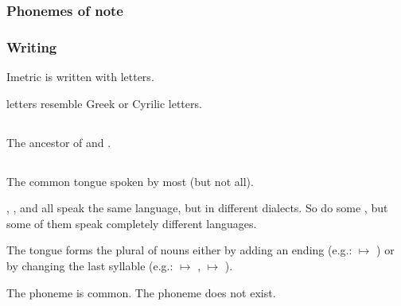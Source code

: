 




\begin{pronunciationenvironment}{\subsubsection{Phonemes of note}}
\end{pronunciationenvironment}





\subsubsection{Writing}
Imetric is written with {\Ortaican{} letters}. 

\Ortaican{} letters resemble Greek or Cyrilic letters. 









\subsection{\Ortaican}
The ancestor of  and . 









\subsection{\Resphan}
The common tongue spoken by most \resphain{} (but not all). 

\Mystraacht, \CiriathSepher, \TiphredSerah{} and \Kezerad{} all speak the same language, but in different dialects. 
So do some \Baelzerach, but some of them speak completely different languages. 

The \Resphan{} tongue forms the plural of nouns either by adding an ending (e.g.: \ghobal{} $\mapsto$ \ghobaleth) or by changing the last syllable (e.g.: \resphan{} $\mapsto$ \resphain, \sathariah{} $\mapsto$ \satharioth). 

The phoneme \txipa{[T]} is common. 
The phoneme \txipa{[p]} does not exist. 




